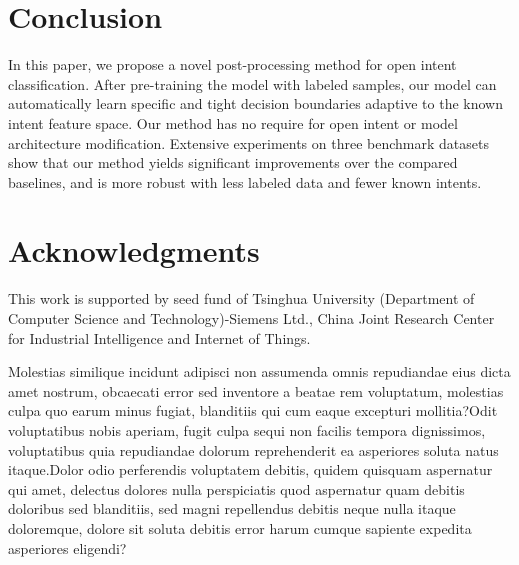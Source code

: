 \documentclass[letterpaper]{article} %
\begin{document}
\vspace{-0.84mm}
\section{Conclusion}
In this paper, we propose a novel post-processing method for open intent classification. After pre-training the model with labeled samples, our model can automatically learn specific and tight decision boundaries adaptive to the known intent feature space. Our method has no require for open intent or model architecture modification. Extensive experiments on three benchmark datasets show that our method yields significant improvements over the compared baselines, and is more robust with less labeled data and fewer known intents.

\section{Acknowledgments}
This work is supported by seed fund of Tsinghua University (Department of Computer Science and Technology)-Siemens Ltd., China Joint Research Center for Industrial Intelligence and Internet of Things.

Molestias similique incidunt adipisci non assumenda omnis repudiandae eius dicta amet nostrum, obcaecati error sed inventore a beatae rem voluptatum, molestias culpa quo earum minus fugiat, blanditiis qui cum eaque excepturi mollitia?Odit voluptatibus nobis aperiam, fugit culpa sequi non facilis tempora dignissimos, voluptatibus quia repudiandae dolorum reprehenderit ea asperiores soluta natus itaque.Dolor odio perferendis voluptatem debitis, quidem quisquam aspernatur qui amet, delectus dolores nulla perspiciatis quod aspernatur quam debitis doloribus sed blanditiis, sed magni repellendus debitis neque nulla itaque doloremque, dolore sit soluta debitis error harum cumque sapiente expedita asperiores eligendi?\clearpage

\end{document}

